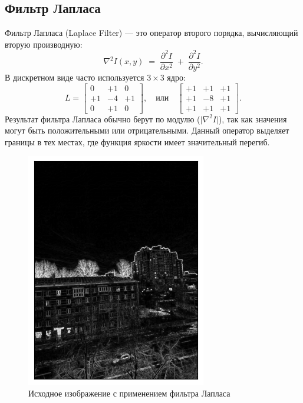 \documentclass[a4paper,12pt]{article}
\begin{document}
\subsection{Фильтр Лапласа}
Фильтр Лапласа (Laplace Filter) --- это оператор второго порядка, вычисляющий вторую производную:
\[
\nabla^2 I(x,y) \;=\; \frac{\partial^2 I}{\partial x^2} \;+\; \frac{\partial^2 I}{\partial y^2}.
\]
В дискретном виде часто используется \(3 \times 3\) ядро:
\[
L = 
\begin{bmatrix}
0 & +1 & 0 \\
+1 & -4 & +1 \\
0 & +1 & 0
\end{bmatrix},
\quad
\text{или}
\quad
\begin{bmatrix}
+1 & +1 & +1 \\
+1 & -8 & +1 \\
+1 & +1 & +1
\end{bmatrix}.
\]
Результат фильтра Лапласа обычно берут по модулю (\(\lvert \nabla^2 I\rvert\)), так как значения могут быть положительными или отрицательными. Данный оператор выделяет границы в тех местах, где функция яркости имеет значительный перегиб.
\begin{figure}[H]
    \centering \includegraphics[width=0.7\textwidth]{results/hpf_3.png}
    \caption{Исходное изображение с применением фильтра Лапласа}
\end{figure}
\end{document}
